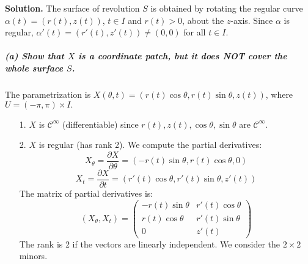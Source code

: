\documentclass[12pt, a4paper, oneside]{article}
\newenvironment{solution}
  {\par\noindent\textbf{Solution. }\newline}
  {\par}
\begin{document}
\begin{solution}
The surface of revolution $S$ is obtained by rotating the regular curve $\alpha(t)=(r(t),z(t))$, $t\in I$ and $r(t)>0$, about the $z$-axis. Since $\alpha$ is regular, $\alpha'(t) = (r'(t), z'(t)) \neq (0,0)$ for all $t \in I$.

\subparagraph{(a) Show that $X$ is a coordinate patch, but it does NOT cover the whole surface $S$.}
The parametrization is $X(\theta,t)=(r(t)\cos\theta, r(t)\sin\theta, z(t))$, where $U=(-\pi,\pi)\times I.$

\begin{enumerate}
    \item[1.] $X$ is $\mathcal{C}^\infty$ (differentiable) since $r(t), z(t), \cos\theta, \sin\theta$ are $\mathcal{C}^\infty$.

    \item[2.] $X$ is regular (has rank 2). We compute the partial derivatives:
    $$
    X_{\theta} = \frac{\partial X}{\partial \theta} = (-r(t)\sin\theta, r(t)\cos\theta, 0)
    $$
    $$
    X_{t} = \frac{\partial X}{\partial t} = (r'(t)\cos\theta, r'(t)\sin\theta, z'(t))
    $$
    The matrix of partial derivatives is:
    $$
    (X_{\theta}, X_{t}) = \begin{pmatrix}
    -r(t)\sin\theta & r'(t)\cos\theta \\
    r(t)\cos\theta & r'(t)\sin\theta \\
    0 & z'(t)
    \end{pmatrix}
    $$
    The rank is 2 if the vectors are linearly independent. We consider the $2\times 2$ minors.
    

\end{enumerate}
\end{solution}
\end{document}
